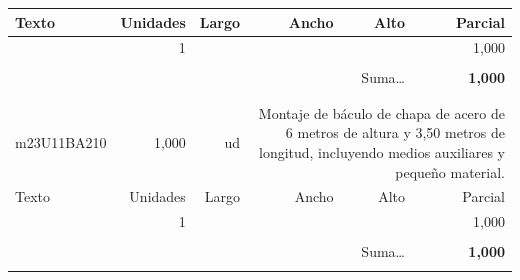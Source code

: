 \documentclass{book}%
\begin{document}
\begin{longtable}{lrrrrr}
Texto&Unidades&Largo&Ancho&Alto&Parcial\\%
\hline%
\multicolumn{1}{p{3.5cm}}{ }&1&&&&     1,000\\%
&&&&&\\%
\multicolumn{5}{r}{Suma\ldots}&\textbf{     1,000}\\%
\hline%
&&&&&\\%
&&&&&\\%
m23U11BA210&     1,000& ud&\multicolumn{3}{p{6cm}}{\scriptsize Montaje de báculo de chapa de acero de 6 metros de altura y 3,50 metros de longitud, incluyendo medios auxiliares y pequeño material.\normalsize}\\%
Texto&Unidades&Largo&Ancho&Alto&Parcial\\%
\hline%
\multicolumn{1}{p{3.5cm}}{ }&1&&&&     1,000\\%
&&&&&\\%
\multicolumn{5}{r}{Suma\ldots}&\textbf{     1,000}\\%
\hline%
&&&&&\\%
\end{longtable}%
\newpage

%
\end{document}
